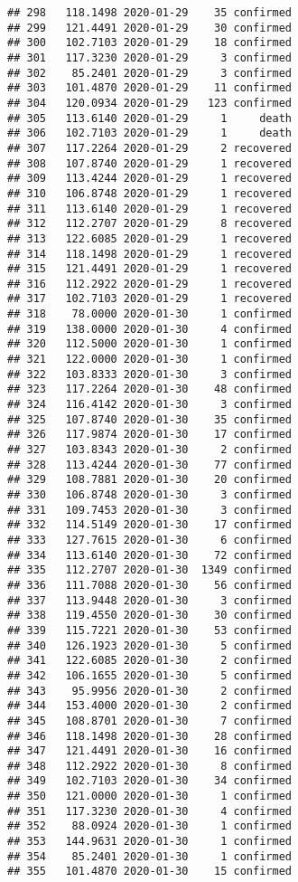 \documentclass[
]{article}
\begin{document}
\begin{verbatim}
## 298   118.1498 2020-01-29    35 confirmed
## 299   121.4491 2020-01-29    30 confirmed
## 300   102.7103 2020-01-29    18 confirmed
## 301   117.3230 2020-01-29     3 confirmed
## 302    85.2401 2020-01-29     3 confirmed
## 303   101.4870 2020-01-29    11 confirmed
## 304   120.0934 2020-01-29   123 confirmed
## 305   113.6140 2020-01-29     1     death
## 306   102.7103 2020-01-29     1     death
## 307   117.2264 2020-01-29     2 recovered
## 308   107.8740 2020-01-29     1 recovered
## 309   113.4244 2020-01-29     1 recovered
## 310   106.8748 2020-01-29     1 recovered
## 311   113.6140 2020-01-29     1 recovered
## 312   112.2707 2020-01-29     8 recovered
## 313   122.6085 2020-01-29     1 recovered
## 314   118.1498 2020-01-29     1 recovered
## 315   121.4491 2020-01-29     1 recovered
## 316   112.2922 2020-01-29     1 recovered
## 317   102.7103 2020-01-29     1 recovered
## 318    78.0000 2020-01-30     1 confirmed
## 319   138.0000 2020-01-30     4 confirmed
## 320   112.5000 2020-01-30     1 confirmed
## 321   122.0000 2020-01-30     1 confirmed
## 322   103.8333 2020-01-30     3 confirmed
## 323   117.2264 2020-01-30    48 confirmed
## 324   116.4142 2020-01-30     3 confirmed
## 325   107.8740 2020-01-30    35 confirmed
## 326   117.9874 2020-01-30    17 confirmed
## 327   103.8343 2020-01-30     2 confirmed
## 328   113.4244 2020-01-30    77 confirmed
## 329   108.7881 2020-01-30    20 confirmed
## 330   106.8748 2020-01-30     3 confirmed
## 331   109.7453 2020-01-30     3 confirmed
## 332   114.5149 2020-01-30    17 confirmed
## 333   127.7615 2020-01-30     6 confirmed
## 334   113.6140 2020-01-30    72 confirmed
## 335   112.2707 2020-01-30  1349 confirmed
## 336   111.7088 2020-01-30    56 confirmed
## 337   113.9448 2020-01-30     3 confirmed
## 338   119.4550 2020-01-30    30 confirmed
## 339   115.7221 2020-01-30    53 confirmed
## 340   126.1923 2020-01-30     5 confirmed
## 341   122.6085 2020-01-30     2 confirmed
## 342   106.1655 2020-01-30     5 confirmed
## 343    95.9956 2020-01-30     2 confirmed
## 344   153.4000 2020-01-30     2 confirmed
## 345   108.8701 2020-01-30     7 confirmed
## 346   118.1498 2020-01-30    28 confirmed
## 347   121.4491 2020-01-30    16 confirmed
## 348   112.2922 2020-01-30     8 confirmed
## 349   102.7103 2020-01-30    34 confirmed
## 350   121.0000 2020-01-30     1 confirmed
## 351   117.3230 2020-01-30     4 confirmed
## 352    88.0924 2020-01-30     1 confirmed
## 353   144.9631 2020-01-30     1 confirmed
## 354    85.2401 2020-01-30     1 confirmed
## 355   101.4870 2020-01-30    15 confirmed

\end{verbatim}
\end{document}
